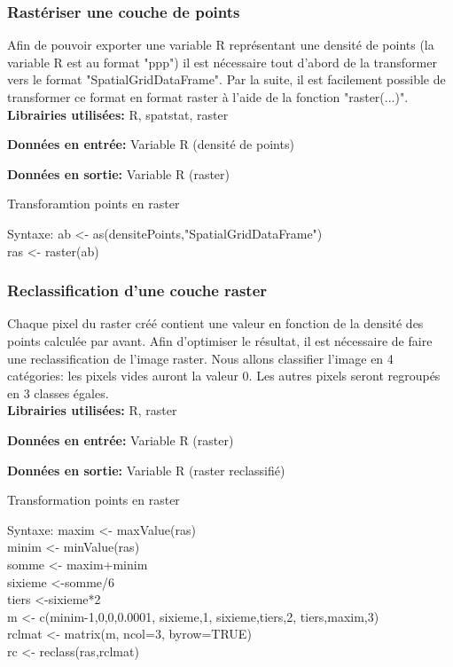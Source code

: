 \subsubsection{Rastériser une couche de points}

Afin de pouvoir exporter une variable R représentant une densité de points (la variable R est au format "ppp") il est nécessaire tout d'abord de la transformer vers le format "SpatialGridDataFrame". Par la suite, il est facilement possible de transformer ce format en format raster à l'aide de la fonction "raster(...)".\\

\textbf{Librairies utilisées:} R, spatstat, raster

\textbf{Données en entrée:}  Variable R (densité de points)

\textbf{Données en sortie:} Variable R (raster)\\

\begin{algorithm}[H]
\caption{\label{traitementpointsverraster} Transforamtion points en raster}
Syntaxe:
ab <- as(densitePoints,"SpatialGridDataFrame")\\
ras <- raster(ab)
\end{algorithm}

\subsubsection{Reclassification d'une couche raster}

Chaque pixel du raster créé contient une valeur en fonction de la densité des points calculée par avant. Afin d'optimiser le résultat, il est nécessaire de faire une reclassification de l'image raster. Nous allons classifier l'image en 4 catégories: les pixels vides auront la valeur 0. Les autres pixels seront regroupés en 3 classes égales.\\

\textbf{Librairies utilisées:} R, raster

\textbf{Données en entrée:}  Variable R (raster)

\textbf{Données en sortie:} Variable R (raster reclassifié)\\

\begin{algorithm}[H]
\caption{\label{reclassification} Transformation points en raster}
Syntaxe:
maxim <- maxValue(ras)\\
minim <- minValue(ras)\\
somme <- maxim+minim\\
sixieme <-somme/6\\
tiers <-sixieme*2\\
m <- c(minim-1,0,0,0.0001, sixieme,1, sixieme,tiers,2, tiers,maxim,3)\\
rclmat <- matrix(m, ncol=3, byrow=TRUE)\\
rc <- reclass(ras,rclmat)\\
\end{algorithm}

